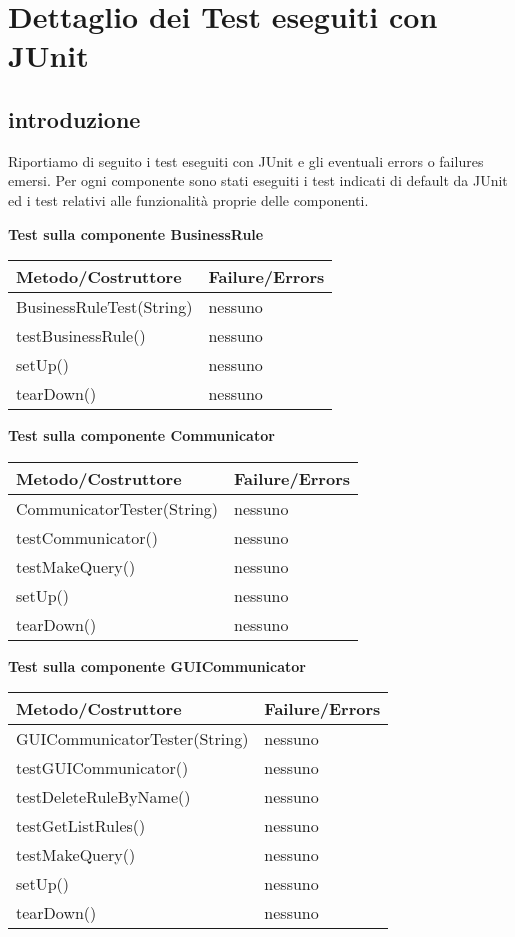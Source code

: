 \chapter{Dettaglio dei Test eseguiti con JUnit}
\section{introduzione}
Riportiamo di seguito i test eseguiti con JUnit e gli eventuali errors o failures emersi.
Per ogni componente sono stati eseguiti i test indicati di default da JUnit ed i test relativi alle funzionalit\`a proprie delle componenti.
\begin{center}
\textbf{Test sulla componente BusinessRule}\\
\begin{tabular}{|p{}|p{3 cm}|} \hline
\textbf{Metodo/Costruttore} & \textbf{Failure/Errors} \\ \hline
BusinessRuleTest(String) & nessuno \\ \hline
testBusinessRule() & nessuno \\ \hline
setUp() & nessuno \\ \hline
tearDown() & nessuno \\ \hline
\end{tabular}

\textbf{Test sulla componente Communicator}\\
\begin{tabular}{|p{}|p{3 cm}|} \hline
\textbf{Metodo/Costruttore} & \textbf{Failure/Errors} \\ \hline
CommunicatorTester(String) & nessuno \\ \hline
testCommunicator() & nessuno \\ \hline
testMakeQuery() & nessuno \\ \hline
setUp() & nessuno \\ \hline
tearDown() & nessuno \\ \hline
\end{tabular}

\textbf{Test sulla componente GUICommunicator}\\
\begin{tabular}{|p{}|p{3 cm}|} \hline
\textbf{Metodo/Costruttore} & \textbf{Failure/Errors} \\ \hline
GUICommunicatorTester(String) & nessuno \\ \hline
testGUICommunicator() & nessuno \\ \hline
testDeleteRuleByName() & nessuno \\ \hline
testGetListRules() & nessuno \\ \hline
testMakeQuery() & nessuno \\ \hline
setUp() & nessuno \\ \hline
tearDown() & nessuno \\ \hline
\end{tabular}


\end{center}

